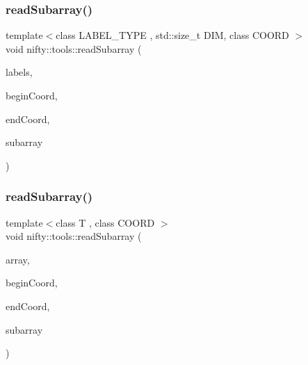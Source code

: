\mbox{\label{namespacenifty_1_1tools_a5d64102d01cdba610156da964f4b2581}} 
\subsubsection{\texorpdfstring{read\+Subarray()}{readSubarray()}\hspace{0.1cm}{\footnotesize\ttfamily [3/4]}}
{\footnotesize\ttfamily template$<$class L\+A\+B\+E\+L\+\_\+\+T\+Y\+PE , std\+::size\+\_\+t D\+IM, class C\+O\+O\+RD $>$ \\
void nifty\+::tools\+::read\+Subarray (\begin{DoxyParamCaption}\item[{const \hyperlink{classnifty_1_1graph_1_1ExplicitLabels}{graph\+::\+Explicit\+Labels}$<$ D\+IM, L\+A\+B\+E\+L\+\_\+\+T\+Y\+PE $>$ \&}]{labels,  }\item[{const C\+O\+O\+RD \&}]{begin\+Coord,  }\item[{const C\+O\+O\+RD \&}]{end\+Coord,  }\item[{\hyperlink{classandres_1_1View}{marray\+::\+View}$<$ L\+A\+B\+E\+L\+\_\+\+T\+Y\+PE $>$ \&}]{subarray }\end{DoxyParamCaption})\hspace{0.3cm}{\ttfamily [inline]}}

\mbox{\label{namespacenifty_1_1tools_a8b0e46da1e0ed94de12c1ea0b89a07d9}} 
\subsubsection{\texorpdfstring{read\+Subarray()}{readSubarray()}\hspace{0.1cm}{\footnotesize\ttfamily [4/4]}}
{\footnotesize\ttfamily template$<$class T , class C\+O\+O\+RD $>$ \\
void nifty\+::tools\+::read\+Subarray (\begin{DoxyParamCaption}\item[{const hdf5\+::\+Hdf5\+Array$<$ T $>$ \&}]{array,  }\item[{const C\+O\+O\+RD \&}]{begin\+Coord,  }\item[{const C\+O\+O\+RD \&}]{end\+Coord,  }\item[{\hyperlink{classandres_1_1View}{marray\+::\+View}$<$ T $>$ \&}]{subarray }\end{DoxyParamCaption})\hspace{0.3cm}{\ttfamily [inline]}}

